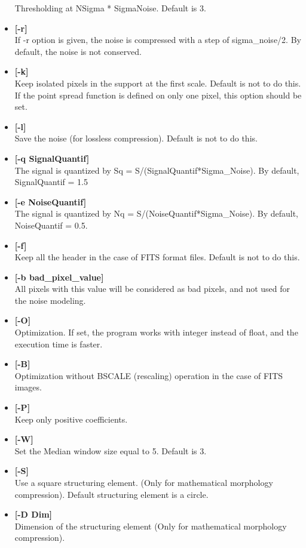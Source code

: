 \begin{itemize}
Thresholding at NSigma * SigmaNoise. Default is 3.
\item {\bf [-r]} \\
If -r option is given, the noise is compressed
with a step of sigma\_noise/2. By default, the noise is not conserved.
\item {\bf [-k]} \\
Keep isolated pixels in the support at the first scale. Default is not to do 
this.
If the point spread function is defined on only one pixel, 
this option should be set.
\item {\bf [-l]} \\
Save the noise (for lossless compression). Default is not to do this.
\item {\bf [-q SignalQuantif]} \\
The signal is quantized by Sq = S/(SignalQuantif*Sigma\_Noise).
By default, SignalQuantif = 1.5
\item {\bf [-e NoiseQuantif]} \\
The signal is quantized by Nq = S/(NoiseQuantif*Sigma\_Noise).
By default, NoiseQuantif = 0.5.
\item {\bf [-f]} \\
Keep all the header in the case of FITS format files. Default is not to do 
this.
\item {\bf [-b bad\_pixel\_value]} \\
All pixels with this value will be considered as bad pixels, 
and not used for the noise modeling.
\item {\bf [-O]} \\
Optimization. If set, the program works with integer instead of float,
and the execution time is faster.
\item {\bf [-B]} \\
Optimization without BSCALE (rescaling) operation in the case of FITS images.
\item {\bf [-P]} \\
Keep only positive coefficients. 
\item {\bf [-W]} \\
Set the Median window size equal to 5. Default is 3.
\item {\bf [-S]} \\
Use a square structuring element. (Only for mathematical 
morphology compression).
 Default structuring element is a circle.
\item {\bf [-D Dim]} \\
 Dimension of the structuring element (Only for mathematical 
morphology compression).

\end{itemize}
